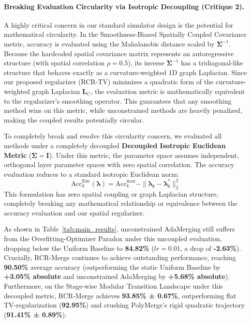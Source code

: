 \paragraph{Breaking Evaluation Circularity via Isotropic Decoupling (Critique 2).}
A highly critical concern in our standard simulator design is the potential for mathematical circularity. In the Smoothness-Biased Spatially Coupled Covariance metric, accuracy is evaluated using the Mahalanobis distance scaled by $\boldsymbol{\Sigma}^{-1}$. Because the hardcoded spatial covariance matrix represents an autoregressive structure (with spatial correlation $\rho=0.5$), its inverse $\boldsymbol{\Sigma}^{-1}$ has a tridiagonal-like structure that behaves exactly as a curvature-weighted 1D graph Laplacian. Since our proposed regularizer (RCR-TV) minimizes a quadratic form of the curvature-weighted graph Laplacian $\mathbf{L}_C$, the evaluation metric is mathematically equivalent to the regularizer's smoothing operator. This guarantees that any smoothing method wins on this metric, while unconstrained methods are heavily penalized, making the coupled results potentially circular.

To completely break and resolve this circularity concern, we evaluated all methods under a completely decoupled \textbf{Decoupled Isotropic Euclidean Metric} ($\boldsymbol{\Sigma} = \mathbf{I}$). Under this metric, the parameter space assumes independent, orthogonal layer parameter spaces with zero spatial correlation. The accuracy evaluation reduces to a standard isotropic Euclidean norm:
\begin{equation}
\text{Acc}_k^{\text{Euc}}(\boldsymbol{\lambda}) = \text{Acc}_k^{\text{max}} - \|\boldsymbol{\lambda}_k - \boldsymbol{\lambda}_k^*\|_2^2
\end{equation}
This formulation has zero spatial coupling or graph Laplacian structure, completely breaking any mathematical relationship or equivalence between the accuracy evaluation and our spatial regularizer. 

As shown in Table~\ref{tab:main_results}, unconstrained AdaMerging still suffers from the Overfitting-Optimizer Paradox under this uncoupled evaluation, dropping below the Uniform Baseline to \textbf{84.82\%} ($lr=0.01$, a drop of \textbf{-2.63\%}). Crucially, RCR-Merge continues to achieve outstanding performance, reaching \textbf{90.50\%} average accuracy (outperforming the static Uniform Baseline by \textbf{+3.05\% absolute} and unconstrained AdaMerging by \textbf{+5.68\% absolute}). Furthermore, on the Stage-wise Modular Transition Landscape under this decoupled metric, RCR-Merge achieves \textbf{93.85\% ± 0.67\%}, outperforming flat TV-regularization (\textbf{92.95\%}) and crushing PolyMerge's rigid quadratic trajectory (\textbf{91.41\% ± 0.89\%}).

